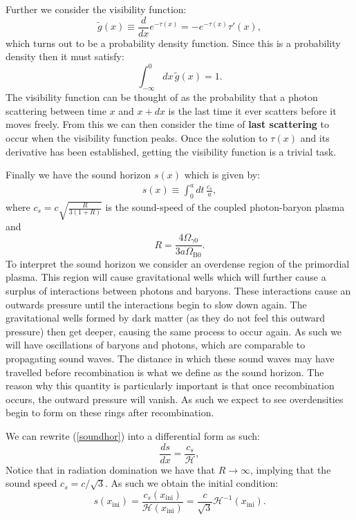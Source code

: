 \documentclass[%
reprint,
 amsmath,amssymb,
 aps,
]{revtex4-2}
\newcommand{\Hp}{\mathcal{H}}
\begin{document}
Further we consider the visibility function:
\begin{equation}
	\tilde g(x)\equiv\frac{d}{dx}e^{-\tau(x)}=-e^{-\tau(x)}\tau'(x), \label{gtilde}
\end{equation}
which turns out to be a probability density function. Since this is a probability density then it must satisfy:
\[\int_{-\infty}^0dx\,\tilde g(x)=1.\]
The visibility function can be thought of as the probability that a photon scattering between time $x$ and $x+dx$ is the last time it ever scatters before it moves freely. From this we can then consider the time of \textbf{last scattering} to occur when the visibility function peaks. Once the solution to $\tau(x)$ and its derivative has been established, getting the visibility function is a trivial task.

Finally we have the sound horizon $s(x)$ which is given by:
\begin{align}
	s(x)\equiv\int_0^adt\,\frac{c_s}{a}, \label{soundhor}
\end{align}
where $c_s=c\sqrt{\frac{R}{3(1+R)}}$ is the sound-speed of the coupled photon-baryon plasma and
\begin{equation}
	R=\frac{4\Omega_{\gamma0}}{3a\Omega_{\text{B}0}}.\label{eq:R}
\end{equation}
To interpret the sound horizon we consider an overdense region of the primordial plasma. This region will cause gravitational wells which will further cause a surplus of interactions between photons and baryons. These interactions cause an outwards pressure until the interactions begin to slow down again. The gravitational wells formed by dark matter (as they do not feel this outward pressure) then get deeper, causing the same process to occur again. As such we will have oscillations of baryons and photons, which are comparable to propagating sound waves. The distance in which these sound waves may have travelled before recombination is what we define as the sound horizon. The reason why this quantity is particularly important is that once recombination occurs, the outward pressure will vanish. As such we expect to see overdensities begin to form on these rings after recombination. 

We can rewrite (\ref{soundhor}) into a differential form as such:
\begin{equation}
	\frac{ds}{dx}=\frac{c_s}{\Hp},
\end{equation}
Notice that in radiation domination we have that $R\to\infty$, implying that the sound speed $c_s=c/\sqrt{3}$. As such we obtain the initial condition:
\[s(x_{\text{ini}})=\frac{c_s(x_{\text{ini}})}{\Hp(x_{\text{ini}})}=\frac{c}{\sqrt{3}}\Hp^{-1}(x_{\text{ini}}).\] 
\end{document}
